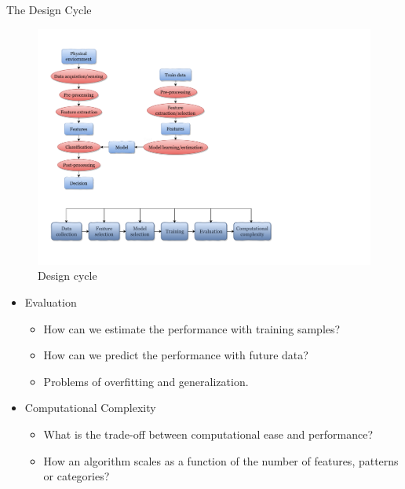 \begin{frame}{The Design Cycle}
\begin{figure}
\includegraphics[width=\textwidth]{Figures/DesignCycle}
\caption{Design cycle}
\end{figure}
\vspace{-12pt}
\begin{itemize}
\setlength{\itemsep}{12pt}
\item {\color{mycolor2}Evaluation}
\begin{itemize}
\setlength{\itemsep}{2pt}
\item How can we estimate the performance with training
samples?
\item How can we predict the performance with future data?
\item Problems of overfitting and generalization.
\end{itemize}
\item {\color{mycolor2}Computational Complexity}
\begin{itemize}
\setlength{\itemsep}{2pt}
\item What is the trade-off between computational ease and performance?
\item How an algorithm scales as a function of the number of features, patterns or categories?
\end{itemize}
\end{itemize}
\end{frame}


